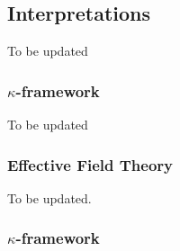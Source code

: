 \subsection{Interpretations} \label{sec:eft_int}
To be updated
\subsubsection{$\kappa$-framework}
To be updated
\subsubsection{Effective Field Theory}
To be updated.
\subsubsection{$\kappa$-framework}
